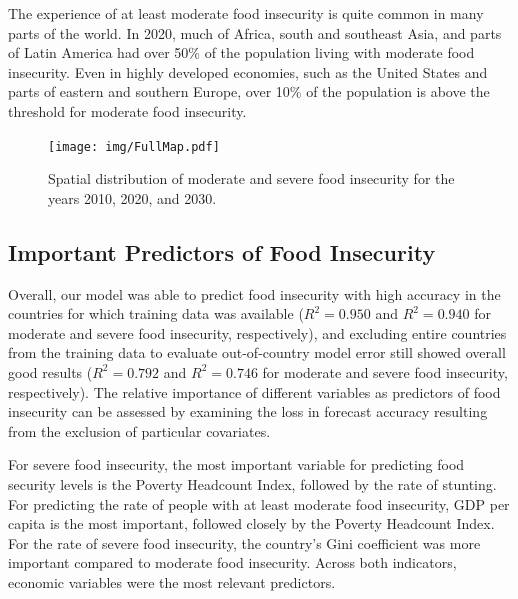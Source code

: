 \documentclass{article}
\begin{document}
The experience of at least moderate food insecurity is quite common in many parts of the world.  In 2020, much of Africa, south and southeast Asia, and parts of Latin America had over 50\% of the population living with moderate food insecurity.  Even in highly developed economies, such as the United States and parts of eastern and southern Europe, over 10\% of the population is above the threshold for moderate food insecurity.

\begin{landscape}
\begin{figure}[h]
  \centering
  \texttt{[image: img/FullMap.pdf]}
  \caption{Spatial distribution of moderate and severe food insecurity for the years 2010, 2020, and 2030.}
  \label{fig:map}
\end{figure}
\end{landscape}

\subsection{Important Predictors of Food Insecurity}
Overall, our model was able to predict food insecurity with high accuracy in the countries for which training data was available ($R^2 = 0.950$ and $R^2 = 0.940$ for moderate and severe food insecurity, respectively), and excluding entire countries from the training data to evaluate out-of-country model error still showed overall good results ($R^2 = 0.792$ and $R^2 = 0.746$ for moderate and severe food insecurity, respectively).  The relative importance of different variables as predictors of food insecurity can be assessed by examining the loss in forecast accuracy resulting from the exclusion of particular covariates.

For severe food insecurity, the most important variable for predicting food security levels is the Poverty Headcount Index, followed by the rate of stunting.  For predicting the rate of people with at least moderate food insecurity, GDP per capita is the most important, followed closely by the Poverty Headcount Index.  For the rate of severe food insecurity, the country's Gini coefficient was more important compared to moderate food insecurity.  Across both indicators, economic variables were the most relevant predictors.
\end{document}
